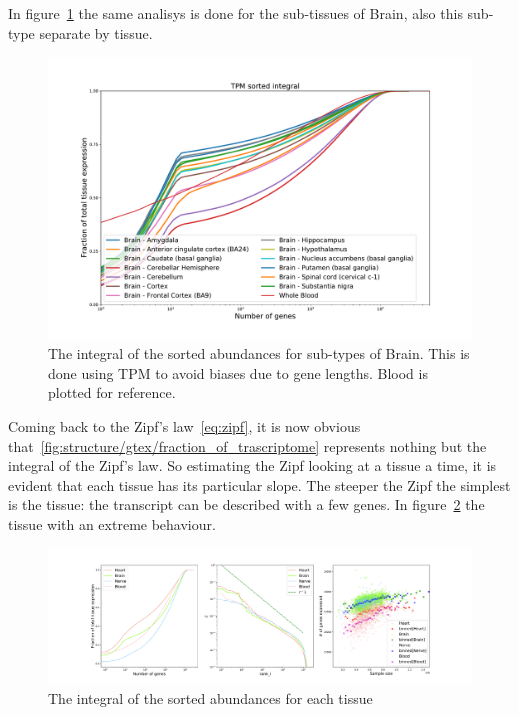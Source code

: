 In figure~\ref{fig:structure/gtex/fraction_of_trascriptome_Brain} the same analisys is done for the sub-tissues of Brain, also this sub-type separate by tissue.
\begin{figure}[htb!]
  \centering
  \includegraphics[width=0.9\linewidth]{pictures/structure/gtex/fraction_of_trascriptome_Brain.pdf}
  \caption{The integral of the sorted abundances for sub-types of Brain. This is done using TPM to avoid biases due to gene lengths. Blood is plotted for reference.}
  \label{fig:structure/gtex/fraction_of_trascriptome_Brain}
\end{figure}

Coming back to the Zipf's law~\ref{eq:zipf}, it is now obvious that~\ref{fig:structure/gtex/fraction_of_trascriptome} represents nothing but the integral of the Zipf's law. So estimating the Zipf looking at a tissue a time, it is evident that each tissue has its particular slope. The steeper the Zipf the simplest is the tissue: the transcript can be described with a few genes. In figure~\ref{fig:structure/gtex/zipf_tissue} the tissue with an extreme behaviour.
\begin{figure}[htb!]
  \centering
  \includegraphics[width=0.6\linewidth]{pictures/structure/gtex/zipf_tissue.pdf}
  \caption{The integral of the sorted abundances for each tissue}
  \label{fig:structure/gtex/zipf_tissue}
\end{figure}

